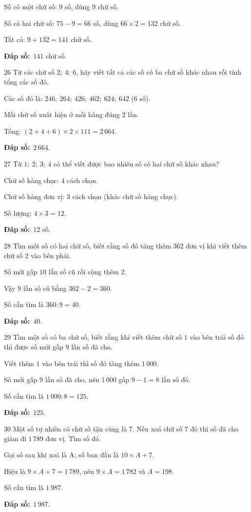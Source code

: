 \documentclass[11pt]{article}
\newif\ifsol \solfalse
\providecommand{\AnsWord}{Đáp số}
\newcommand{\dapso}[1]{\par\textbf{\AnsWord:}\ #1}
\newcommand{\probsol}[1]{%
  \begin{lrbox}{\solmeasure}\begin{minipage}{\dimexpr\linewidth-24pt\relax}#1\end{minipage}\end{lrbox}%
  \ifsol
    \begin{solbox}#1\end{solbox}%
  \else
    \setlength{\solht}{\dimexpr\ht\solmeasure+\dp\solmeasure+0.85cm\relax}%
    \ifdim\solht<1.35cm\setlength{\solht}{1.35cm}\fi
    \begin{tcolorbox}[colback=white,colframe=Line,boxrule=0.8pt,arc=5pt,
      left=8pt,right=8pt,top=4pt,bottom=4pt,height=\solht]{\footnotesize\color{Slate}\itshape\WorkWord}\end{tcolorbox}%
  \fi}
\newcommand{\gap}{\vspace{0.3cm}}
\def\WorkWord{Bài làm:}
\def\AnsWord{Đáp số}
\begin{document}
\probsol{
Số có một chữ số: $9$ số, dùng $9$ chữ số.\par Số có hai chữ số: $75-9=66$ số, dùng $66\times2=132$ chữ số.\par Tất cả: $9+132=141$ chữ số.
\dapso{$141$ chữ số.}}
\gap
\begin{probbox}{26}{\relax}
Từ các chữ số $2;\ 4;\ 6$, hãy viết tất cả các số có ba chữ số khác nhau rồi tính tổng các số đó.
\end{probbox}
\probsol{
Các số đó là: $246;\ 264;\ 426;\ 462;\ 624;\ 642$ ($6$ số).\par Mỗi chữ số xuất hiện ở mỗi hàng đúng $2$ lần.\par Tổng: $(2+4+6)\times2\times111=2\,664$.
\dapso{$2\,664$.}}
\gap
\begin{probbox}{27}{\relax}
Từ $1;\ 2;\ 3;\ 4$ có thể viết được bao nhiêu số có hai chữ số khác nhau?
\end{probbox}
\probsol{
Chữ số hàng chục: $4$ cách chọn.\par Chữ số hàng đơn vị: $3$ cách chọn (khác chữ số hàng chục).\par Số lượng: $4\times3=12$.
\dapso{$12$ số.}}
\gap
\begin{probbox}{28}{\relax}
Tìm một số có hai chữ số, biết rằng số đó tăng thêm $362$ đơn vị khi viết thêm chữ số $2$ vào bên phải.
\end{probbox}
\probsol{
Số mới gấp $10$ lần số cũ rồi cộng thêm $2$.\par Vậy $9$ lần số cũ bằng $362-2=360$.\par Số cần tìm là $360:9=40$.
\dapso{$40$.}}
\gap
\begin{probbox}{29}{\relax}
Tìm một số có ba chữ số, biết rằng khi viết thêm chữ số $1$ vào bên trái số đó thì được số mới gấp $9$ lần số đã cho.
\end{probbox}
\probsol{
Viết thêm $1$ vào bên trái thì số đó tăng thêm $1\,000$.\par Số mới gấp $9$ lần số đã cho, nên $1\,000$ gấp $9-1=8$ lần số đó.\par Số cần tìm là $1\,000:8=125$.
\dapso{$125$.}}
\gap
\begin{probbox}{30}{\relax}
Một số tự nhiên có chữ số tận cùng là $7$. Nếu xoá chữ số $7$ đó thì số đã cho giảm đi $1\,789$ đơn vị. Tìm số đó.
\end{probbox}
\probsol{
Gọi số sau khi xoá là A; số ban đầu là $10\times A+7$.\par Hiệu là $9\times A+7=1\,789$, nên $9\times A=1\,782$ và $A=198$.\par Số cần tìm là $1\,987$.
\dapso{$1\,987$.}}
\end{document}
